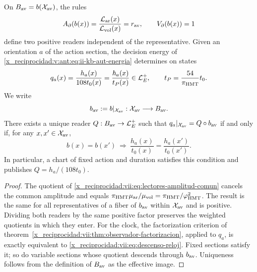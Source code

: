 \begin{proposition}
\label{x_reciprocidad:vii:prop:lectores-frontera-explicitos}
On \(B_{\rm av}=b(\mathcal X_{\rm av})\), the rules
\begin{equation}
 A_\partial(b(x))
 =\frac{\mathcal L_{\rm ar}(x)}{\mathcal L_{\rm vol}(x)}
 =r_{\rm av},\qquad V_\partial(b(x))=1
 \label{x_reciprocidad:vii:eq:lectores-normalizados}
\end{equation}
define two positive readers independent of the representative.
Given an orientation \(a\) of the action section, the decision
energy of \eqref{x_reciprocidad:v:ant:eq:ii-kb-aut-energia} determines on states
\begin{equation}
 q_a(x)=\frac{h_a(x)}{108t_0(x)}
       =\frac{\hbar_a(x)}{t_P(x)}\in\mathcal L_E^+,
 \qquad t_P=\frac{54}{\pi_{\rm HMT}}t_0.
 \label{x_reciprocidad:vii:eq:lector-q-accion}
\end{equation}
We write
\[
 b_{\rm av}:=b|_{\mathcal X_{\rm av}}:
 \mathcal X_{\rm av}\longrightarrow B_{\rm av}.
\]
There exists a unique reader \(Q:B_{\rm av}\to\mathcal L_E^+\) such that
\(q_a|_{\mathcal X_{\rm av}}=Q\circ b_{\rm av}\)
if and only if, for any \(x,x'\in\mathcal X_{\rm av}\),
\begin{equation}
 b(x)=b(x')\ \Longrightarrow\
 \frac{h_a(x)}{t_0(x)}=\frac{h_a(x')}{t_0(x')}.
 \label{x_reciprocidad:vii:eq:descenso-reloj}
\end{equation}
In particular, a chart of fixed action and duration satisfies this
condition and publishes \(Q=h_a/(108t_0)\).
\end{proposition}
\begin{proof}
The quotient of \eqref{x_reciprocidad:vii:eq:lectores-amplitud-comun} cancels the
common amplitude and equals
\(\pi_{\rm HMT}\mu_{\rm ar}/\mu_{\rm vol}
=\pi_{\rm HMT}/\varphi_{\rm HMT}^2\).
The result is the same for all representatives of a fiber
of \(b_{\rm av}\) within \(\mathcal X_{\rm av}\) and is positive.
Dividing both readers by the same positive factor
preserves the weighted quotients in which they enter.
For the clock, the factorization criterion of
theorem~\ref{x_reciprocidad:vii:thm:observador-factorizacion}, applied to \(q_a\),
is exactly equivalent to \eqref{x_reciprocidad:vii:eq:descenso-reloj}. Fixed sections
satisfy it; so do variable sections whose
quotient descends through \(b_{\rm av}\). Uniqueness follows from the definition
of \(B_{\rm av}\) as the effective image.
\end{proof}

